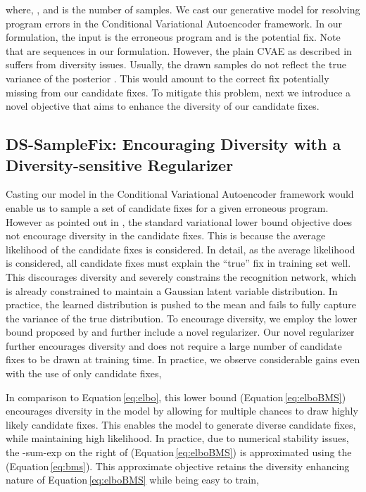 \documentclass[letterpaper]{article} \usepackage{aaai20}  \usepackage{times}  \usepackage{helvet} \usepackage{courier}  \usepackage[hyphens]{url}  \usepackage{graphicx}
\newcommand{\dssmaplefix}{DS-SampleFix}
\newcommand{\equref}{Equation}
\begin{document}
\iffalse

\fi

where, , and  is the number of samples. We cast our generative model for resolving program errors in the Conditional Variational Autoencoder framework. In our formulation, the input  is the erroneous program and  is the potential fix. Note that  are sequences in our formulation. However, the plain CVAE as described in \cite{cvae15sohn} suffers from diversity issues. Usually, the drawn samples do not reflect the true variance of the posterior . This would amount to the correct fix potentially missing from our candidate fixes. To mitigate this problem, next we introduce a novel objective that aims to enhance the diversity of our candidate fixes. 

\subsection{\dssmaplefix: Encouraging Diversity with a Diversity-sensitive Regularizer}
\label{subsec:ds}
Casting our model in the Conditional Variational Autoencoder framework would enable us to sample a set of candidate fixes for a given erroneous program. However as pointed out in \cite{bhattacharyya2018accurate}, the standard variational lower bound objective does not encourage diversity in the candidate fixes. This is because the average likelihood of the candidate fixes is considered. In detail, as the average likelihood is considered, all candidate fixes must explain the ``true'' fix in training set well. This discourages diversity and severely constrains the recognition network, which is already constrained to maintain a Gaussian latent variable distribution. In practice, the learned distribution is pushed to the mean and fails to fully capture the variance of the true distribution. To encourage diversity, we employ the lower bound proposed by \cite{bhattacharyya2018accurate} and further include a novel regularizer. Our novel regularizer further encourages diversity and does not require a large number of candidate fixes  to be drawn at training time. In practice, we observe considerable gains even with the use of only  candidate fixes,



In comparison to \equref \,\ref{eq:elbo}, this lower bound (\equref \,\ref{eq:elboBMS}) encourages diversity in the model by allowing for multiple chances to draw highly likely candidate fixes. This enables the model to generate diverse candidate fixes, while maintaining high likelihood. In practice, due to numerical stability issues, the -sum-exp on the right of (\equref \,\ref{eq:elboBMS}) is approximated using the  (\equref \,\ref{eq:bms}). This approximate objective retains the diversity enhancing nature of \equref \,\ref{eq:elboBMS} while being easy to train,
\end{document}

